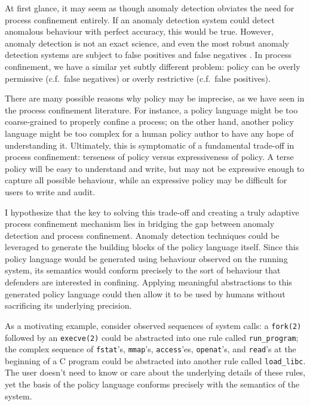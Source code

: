 \documentclass[dvipsnames, 12pt]{article}
\begin{document}
At first glance, it may seem as though anomaly detection obviates the need for
process confinement entirely. If an anomaly detection system could detect
anomalous behaviour with perfect accuracy, this would be true. However, anomaly
detection is not an exact science, and even the most robust anomaly detection
systems are subject to false positives and false negatives . In
process confinement, we have a similar yet subtly different problem: policy can
be overly permissive (c.f.~false negatives) or overly restrictive (c.f.~false
positives).

There are many possible reasons why policy may be imprecise, as we have seen in
the process confinement literature. For instance, a policy language might be too
coarse-grained to properly confine a process; on the other hand, another policy
language might be too complex for a human policy author to have any hope of
understanding it. Ultimately, this is symptomatic of a fundamental trade-off in
process confinement: terseness of policy versus expressiveness of policy. A terse
policy will be easy to understand and write, but may not be expressive enough to
capture all possible behaviour, while an expressive policy may be difficult
for users to write and audit.

I hypothesize that the key to solving this trade-off and creating a truly
adaptive process confinement mechanism lies in bridging the gap between anomaly
detection and process confinement. Anomaly detection techniques could be
leveraged to generate the building blocks of the policy language itself. Since
this policy language would be generated using behaviour observed on the running
system, its semantics would conform precisely to the sort of behaviour that
defenders are interested in confining. Applying meaningful abstractions to this
generated policy language could then allow it to be used by humans without
sacrificing its underlying precision.

As a motivating example, consider observed sequences of system calls:
a \texttt{fork(2)} followed by an \texttt{execve(2)} could be abstracted into
one rule called \texttt{run\_program}; the complex sequence of \texttt{fstat}'s,
\texttt{mmap}'s, \texttt{access}'es, \texttt{openat}'s, and \texttt{read}'s at
the beginning of a C program could be abstracted into another rule called
\texttt{load\_libc}. The user doesn't need to know or care about the underlying
details of these rules, yet the basis of the policy language conforms precisely
with the semantics of the system.
\end{document}
